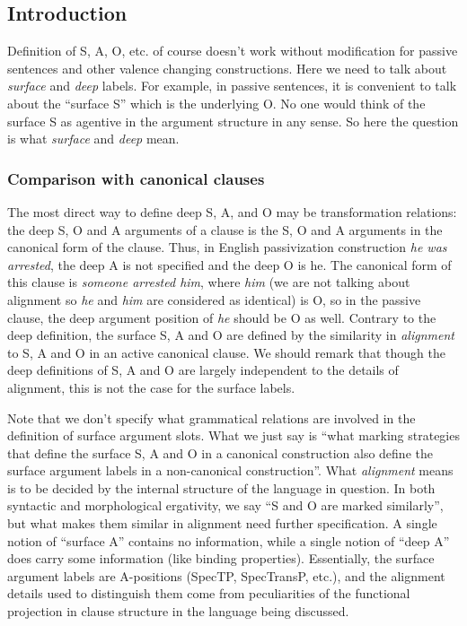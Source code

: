 \documentclass[UTF8, a4paper, oneside, scheme=plain]{ctexart}
\newcommand*{\term}[1]{\emph{#1}}
\newcommand*{\corpus}[1]{\emph{#1}}
\begin{document}
\subsection{Introduction}

Definition of S, A, O, etc. of course doesn't work without modification
for passive sentences and other valence changing constructions. 
Here we need to talk about \term{surface} and \term{deep} labels.
For example, in passive sentences, 
it is convenient to talk about the ``surface S'' which is the underlying O. 
No one would think of the surface S as agentive in the argument structure in any sense. 
So here the question is what \term{surface} and \term{deep} mean.

\subsubsection{Comparison with canonical clauses}

The most direct way to define deep S, A, and O may be transformation relations: 
the deep S, O and A arguments of a clause is the S, O and A arguments in the canonical form of the clause.
Thus, in English passivization construction \corpus{he was arrested}, 
the deep A is not specified and the deep O is he. 
The canonical form of this clause is \corpus{someone arrested him}, 
where \corpus{him} 
(we are not talking about alignment so \corpus{he} and \corpus{him} are considered as identical) is O, 
so in the passive clause, 
the deep argument position of \corpus{he} should be O as well.
Contrary to the deep definition, 
the surface S, A and O are defined by the similarity in \emph{alignment} 
to S, A and O in an active canonical clause. 
We should remark that though the deep definitions of S, A and O are largely independent 
to the details of alignment, 
this is not the case for the surface labels.

Note that we don't specify what grammatical relations are involved 
in the definition of surface argument slots. 
What we just say is ``what marking strategies that define the surface S, A and O 
in a canonical construction also define the surface argument labels in a non-canonical construction''. 
What \term{alignment} means is to be decided by the internal structure of the language in question.
In both syntactic and morphological ergativity,
we say ``S and O are marked similarly'',
but what makes them similar in alignment need further specification.
A single notion of ``surface A'' contains no information,
while a single notion of ``deep A'' does carry some information
(like binding properties).
Essentially, the surface argument labels are A-positions 
(SpecTP, SpecTransP, etc.),
and the alignment details used to distinguish them come from 
peculiarities of the functional projection in clause structure in the language being discussed.
\end{document}
